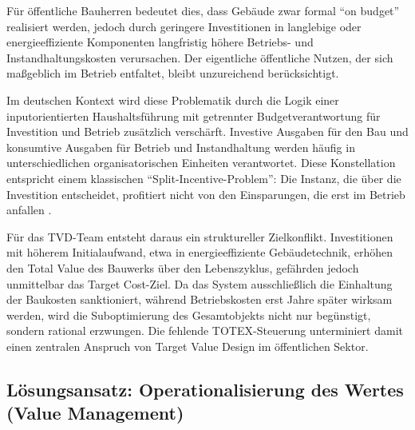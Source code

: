 Für öffentliche Bauherren bedeutet dies, dass Gebäude zwar formal \enquote{on budget} realisiert werden, jedoch durch geringere Investitionen in langlebige oder energieeffiziente Komponenten langfristig höhere Betriebs- und Instandhaltungskosten verursachen. Der eigentliche öffentliche Nutzen, der sich maßgeblich im Betrieb entfaltet, bleibt unzureichend berücksichtigt.

Im deutschen Kontext wird diese Problematik durch die Logik einer inputorientierten Haushaltsführung mit getrennter Budgetverantwortung für Investition und Betrieb zusätzlich verschärft. Investive Ausgaben für den Bau und konsumtive Ausgaben für Betrieb und Instandhaltung werden häufig in unterschiedlichen organisatorischen Einheiten verantwortet. Diese Konstellation entspricht einem klassischen \enquote{Split-Incentive-Problem}: Die Instanz, die über die Investition entscheidet, profitiert nicht von den Einsparungen, die erst im Betrieb anfallen \autocite[Vgl.][S.~26]{kozuch_nachhaltigkeit_2024}.

Für das \acs{TVD}-Team entsteht daraus ein struktureller Zielkonflikt. Investitionen mit höherem Initialaufwand, etwa in energieeffiziente Gebäudetechnik, erhöhen den Total Value des Bauwerks über den Lebenszyklus, gefährden jedoch unmittelbar das Target Cost-Ziel. Da das System ausschließlich die Einhaltung der Baukosten sanktioniert, während Betriebskosten erst Jahre später wirksam werden, wird die Suboptimierung des Gesamtobjekts nicht nur begünstigt, sondern rational erzwungen. Die fehlende \acs{TOTEX}-Steuerung unterminiert damit einen zentralen Anspruch von Target Value Design im öffentlichen Sektor.

\subsection{Lösungsansatz: Operationalisierung des Wertes (Value Management)}
\label{sec:5.2.4}


